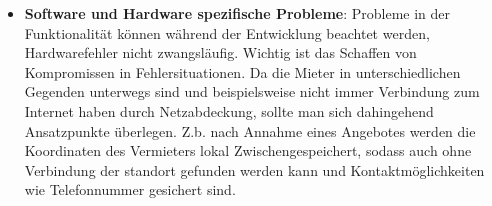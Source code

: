 \begin{itemize}
   \item
   \textbf{Software und Hardware spezifische Probleme}:
   Probleme in der Funktionalität können während der Entwicklung beachtet werden, Hardwarefehler nicht zwangsläufig. Wichtig ist das Schaffen von Kompromissen in Fehlersituationen. 
   Da die Mieter in unterschiedlichen Gegenden unterwegs sind und beispielsweise nicht immer Verbindung zum Internet haben durch Netzabdeckung, sollte man sich dahingehend Ansatzpunkte überlegen. Z.b. nach Annahme eines Angebotes werden die Koordinaten des Vermieters lokal Zwischengespeichert, sodass auch ohne Verbindung der standort gefunden werden kann und Kontaktmöglichkeiten wie Telefonnummer gesichert sind.


    
      
\end{itemize}
 